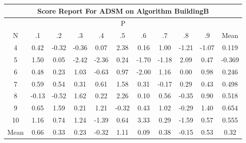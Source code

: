 \documentclass[11pt,a4paper]{report}
\begin{document}
\begin{longtable}{ | c || c | c | c | c | c | c | c | c | c || c |}
\hline
\multicolumn{11}{|c|}{ Score Report For ADSM on Algorithm BuildingB} \\
\hline
\multicolumn{11}{|c|}{ P } \\
\hline
N & .1 & .2 & .3 & .4 & .5 & .6 & .7 & .8 & .9 & Mean\\
 \hline
 \hline
 \endhead
  4 &  \cellcolor[HTML]{F7F7FF} 0.42 &  \cellcolor[HTML]{FFF7F7} -0.32 &  \cellcolor[HTML]{FFF7F7} -0.36 &  \cellcolor[HTML]{FFFFFF} 0.07 &  \cellcolor[HTML]{BFBFFF} 2.38 &  \cellcolor[HTML]{F7F7FF} 0.16 &  \cellcolor[HTML]{E7E7FF} 1.00 &  \cellcolor[HTML]{FFDFDF} -1.21 &  \cellcolor[HTML]{FFE7E7} -1.07 & 0.119 \\
  5 &  \cellcolor[HTML]{D7D7FF} 1.50 &  \cellcolor[HTML]{FFFFFF} 0.05 &  \cellcolor[HTML]{FFBFBF} -2.42 &  \cellcolor[HTML]{FFC7C7} -2.36 &  \cellcolor[HTML]{F7F7FF} 0.24 &  \cellcolor[HTML]{FFD7D7} -1.70 &  \cellcolor[HTML]{FFDFDF} -1.18 &  \cellcolor[HTML]{C7C7FF} 2.09 &  \cellcolor[HTML]{F7F7FF} 0.47 & -0.369 \\
  6 &  \cellcolor[HTML]{EFEFFF} 0.48 &  \cellcolor[HTML]{F7F7FF} 0.23 &  \cellcolor[HTML]{E7E7FF} 1.03 &  \cellcolor[HTML]{FFEFEF} -0.63 &  \cellcolor[HTML]{E7E7FF} 0.97 &  \cellcolor[HTML]{FFCFCF} -2.00 &  \cellcolor[HTML]{DFDFFF} 1.16 &  \cellcolor[HTML]{FFFFFF} 0.00 &  \cellcolor[HTML]{E7E7FF} 0.98 & 0.246 \\
  7 &  \cellcolor[HTML]{EFEFFF} 0.59 &  \cellcolor[HTML]{EFEFFF} 0.54 &  \cellcolor[HTML]{F7F7FF} 0.31 &  \cellcolor[HTML]{EFEFFF} 0.61 &  \cellcolor[HTML]{D7D7FF} 1.58 &  \cellcolor[HTML]{F7F7FF} 0.31 &  \cellcolor[HTML]{FFF7F7} -0.17 &  \cellcolor[HTML]{F7F7FF} 0.29 &  \cellcolor[HTML]{F7F7FF} 0.43 & 0.498 \\
  8 &  \cellcolor[HTML]{FFFFFF} -0.13 &  \cellcolor[HTML]{FFEFEF} -0.52 &  \cellcolor[HTML]{D7D7FF} 1.62 &  \cellcolor[HTML]{F7F7FF} 0.22 &  \cellcolor[HTML]{C7C7FF} 2.26 &  \cellcolor[HTML]{FFFFFF} 0.10 &  \cellcolor[HTML]{EFEFFF} 0.56 &  \cellcolor[HTML]{FFF7F7} -0.35 &  \cellcolor[HTML]{E7E7FF} 0.90 & 0.518 \\
  9 &  \cellcolor[HTML]{EFEFFF} 0.65 &  \cellcolor[HTML]{D7D7FF} 1.59 &  \cellcolor[HTML]{F7F7FF} 0.21 &  \cellcolor[HTML]{DFDFFF} 1.21 &  \cellcolor[HTML]{FFF7F7} -0.32 &  \cellcolor[HTML]{F7F7FF} 0.43 &  \cellcolor[HTML]{E7E7FF} 1.02 &  \cellcolor[HTML]{FFF7F7} -0.29 &  \cellcolor[HTML]{DFDFFF} 1.40 & 0.654 \\
  10 &  \cellcolor[HTML]{DFDFFF} 1.16 &  \cellcolor[HTML]{EFEFFF} 0.74 &  \cellcolor[HTML]{DFDFFF} 1.24 &  \cellcolor[HTML]{FFDFDF} -1.39 &  \cellcolor[HTML]{EFEFFF} 0.64 &  \cellcolor[HTML]{AFAFFF} 3.33 &  \cellcolor[HTML]{F7F7FF} 0.29 &  \cellcolor[HTML]{FFD7D7} -1.59 &  \cellcolor[HTML]{EFEFFF} 0.57 & 0.555 \\
 \hline
 \hline
Mean &  \cellcolor[HTML]{EFEFFF} 0.66 &  \cellcolor[HTML]{F7F7FF} 0.33 &  \cellcolor[HTML]{F7F7FF} 0.23 &  \cellcolor[HTML]{FFF7F7} -0.32 &  \cellcolor[HTML]{E7E7FF} 1.11 &  \cellcolor[HTML]{FFFFFF} 0.09 &  \cellcolor[HTML]{F7F7FF} 0.38 &  \cellcolor[HTML]{FFFFFF} -0.15 &  \cellcolor[HTML]{EFEFFF} 0.53 &  \cellcolor[HTML]{F7F7FF} 0.32
\end{longtable}
\end{document}
